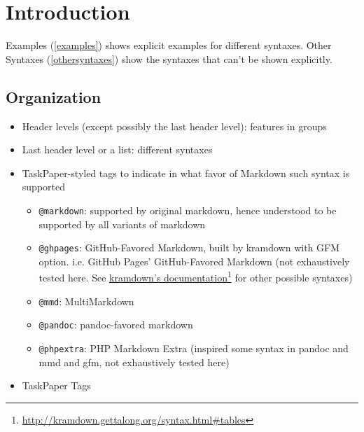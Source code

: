 \chapter{Introduction}
\label{introduction}

Examples (\autoref{examples}) shows explicit examples for different syntaxes. Other Syntaxes (\autoref{othersyntaxes}) show the syntaxes that can't be shown explicitly.

\section{Organization}
\label{organization}

\begin{itemize}
\item Header levels (except possibly the last header level): features in groups

\item Last header level or a list: different syntaxes

\item TaskPaper-styled tags to indicate in what favor of Markdown such syntax is supported

\begin{itemize}
\item \texttt{@markdown}: supported by original markdown, hence understood to be supported by all variants of markdown

\item \texttt{@ghpages}: GitHub-Favored Markdown, built by kramdown with GFM option. i.e. GitHub Pages' GitHub-Favored Markdown (not exhaustively tested here. See \href{http://kramdown.gettalong.org/syntax.html#tables}{kramdown's documentation}\footnote{\href{http://kramdown.gettalong.org/syntax.html\#tables}{http:/\slash kramdown.gettalong.org\slash syntax.html\#tables}} for other possible syntaxes)

\item \texttt{@mmd}: MultiMarkdown 

\item \texttt{@pandoc}: pandoc-favored markdown

\item \texttt{@phpextra}: PHP Markdown Extra (inspired some syntax in pandoc and mmd and gfm, not exhaustively tested here)

\end{itemize}

\item TaskPaper Tags


\end{itemize}
